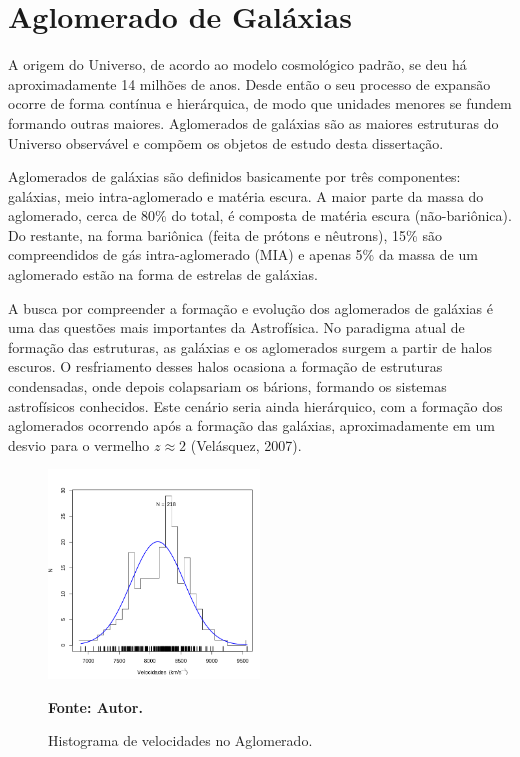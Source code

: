 
\chapter{Aglomerado de Galáxias}
A origem do Universo, de acordo ao modelo cosmológico padrão, se deu há aproximadamente 14 milhões de anos. Desde então o seu processo de expansão ocorre de forma contínua e hierárquica, de modo que unidades menores se fundem formando outras maiores. Aglomerados de galáxias são as maiores estruturas do Universo observável e compõem os objetos de estudo desta dissertação.  

Aglomerados de galáxias são definidos basicamente por três componentes: galáxias, meio intra-aglomerado e matéria escura. A maior parte da massa do aglomerado, cerca de 80\% do total, é composta de matéria escura (não-bariônica). Do restante, na forma bariônica (feita de prótons e nêutrons), 15\% são compreendidos de gás intra-aglomerado (MIA) e apenas 5\% da massa de um aglomerado estão na forma de estrelas de galáxias.

A busca por compreender a formação e evolução dos aglomerados de galáxias é uma das questões mais importantes da Astrofísica. No paradigma atual de formação das estruturas, as galáxias e os aglomerados surgem a partir de halos escuros. O resfriamento desses halos ocasiona a formação de estruturas condensadas, onde depois colapsariam os bárions, formando  os sistemas astrofísicos conhecidos. Este cenário seria ainda hierárquico, com a formação dos aglomerados ocorrendo após a formação das galáxias, aproximadamente em um desvio para o vermelho $z \approx 2$ (Velásquez, 2007).
\begin{figure}[H]
	\centering
	\includegraphics[width=0.5\textwidth]{04-figuras/10043dist}
	\caption{Histograma de velocidades no Aglomerado.}
	\textbf{Fonte: Autor.}
	\label{fig1}
\end{figure}

